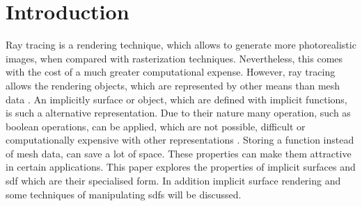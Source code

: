 


\section{Introduction}
\label{section:Introduction}


Ray tracing is a rendering technique, which allows to generate more photorealistic images, when compared with rasterization techniques. Nevertheless, this comes with the cost of a much greater computational expense. However, ray tracing allows the rendering objects, which are represented by other means than mesh data \cite{bungartz:2013:einfuhrung}. An implicitly surface or object, which are defined with implicit functions, is such a alternative representation. Due to their nature many operation, such as boolean operations, can be applied, which are not possible, difficult or computationally expensive with other representations  \cite{osher:2006:level}  \cite{quilez:2008:distfunctions}. Storing a function instead of mesh data, can save a lot of space. These properties can make them attractive in certain applications. This paper explores the properties of implicit surfaces and \gls{sdf} which are their specialised form. In addition implicit surface rendering and some techniques of manipulating \glspl{sdf} will be discussed.
